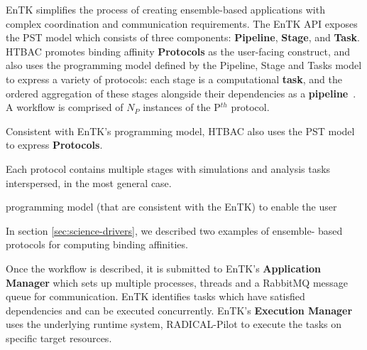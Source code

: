 EnTK simplifies the process of creating ensemble-based applications with
complex coordination and communication requirements. The EnTK API exposes the
PST model which consists of three components: \textbf{Pipeline},
\textbf{Stage}, and \textbf{Task}. HTBAC promotes binding affinity  {\bf
Protocols} as the user-facing construct, and also uses the programming model
defined by the Pipeline, Stage and Tasks model to express a variety of
protocols: each stage is a computational \textbf{task}, and the
ordered aggregation of these stages alongside their dependencies as a
\textbf{pipeline}~\cite{power-of-many17}. 
A workflow is comprised of $N_P$ instances of the P$^{th}$ protocol.



Consistent with EnTK's programming model, HTBAC also uses the PST model to
express {\bf Protocols}.

Each protocol contains multiple stages with simulations and analysis tasks
interspersed, in the most general case. 


programming model (that are consistent with the EnTK) to enable the user 

In section \ref{sec:science-drivers}, we described two examples of ensemble-
based protocols for computing binding affinities.











Once the workflow is described, it is submitted to EnTK's
\textbf{Application Manager} which sets up multiple processes, threads and a
RabbitMQ message queue for communication.
EnTK identifies tasks which have satisfied dependencies and can be executed
concurrently. EnTK's \textbf{Execution Manager} uses the underlying runtime
system, RADICAL-Pilot to execute the tasks on specific target resources.



